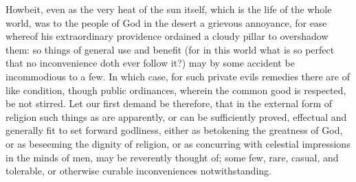 Howbeit, even as the very heat of the sun itself, which is the life of the whole world, was to the people of God in the desert a grievous annoyance, for ease whereof his extraordinary providence ordained a cloudy pillar to overshadow them: so things of general use and benefit (for in this world what is so perfect that no inconvenience doth ever follow it?) may by some accident be incommodious to a few. In which case, for such private evils remedies there are of like condition, though public ordinances, wherein the common good is respected, be not stirred.
Let our first demand be therefore, that in the external form of religion such things as are apparently, or can be sufficiently proved, effectual and generally fit to set forward godliness, either as betokening the greatness of God, or as beseeming the dignity of religion, or as concurring with celestial impressions in the minds of men, may be reverently thought of; some few, rare, casual, and tolerable, or otherwise curable inconveniences notwithstanding.

